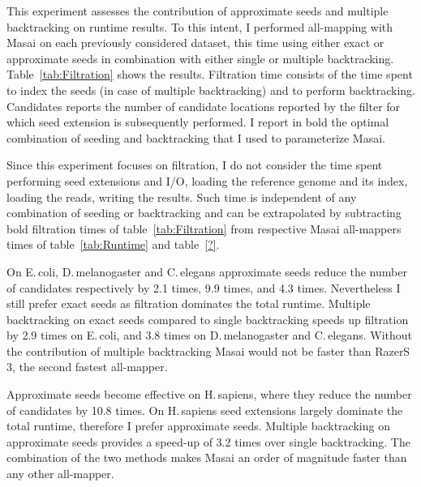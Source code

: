 This experiment assesses the contribution of approximate seeds and multiple backtracking on runtime results.
To this intent, I performed all-mapping with Masai on each previously considered dataset, this time using either exact or approximate seeds in combination with either single or multiple backtracking.
Table~\ref{tab:Filtration} shows the results.
Filtration time consists of the time spent to index the seeds (in case of multiple backtracking) and to perform backtracking.
Candidates reports the number of candidate locations reported by the filter for which seed extension is subsequently performed.
I report in bold the optimal combination of seeding and backtracking that I used to parameterize Masai.

Since this experiment focuses on filtration, I do not consider the time spent performing seed extensions and I/O, \ie loading the reference genome and its index, loading the reads, writing the results.
Such time is independent of any combination of seeding or backtracking and can be extrapolated by subtracting bold filtration times of table~\ref{tab:Filtration} from respective Masai all-mappers times of table~\ref{tab:Runtime} and table~\ref{?}.

On E.\,coli, D.\,melanogaster and C.\,elegans approximate seeds reduce the number of candidates respectively by 2.1 times, 9.9 times, and 4.3 times.
Nevertheless I still prefer exact seeds as filtration dominates the total runtime.
Multiple backtracking on exact seeds compared to single backtracking speeds up filtration by 2.9 times on E.\,coli, and 3.8 times on D.\,melanogaster and C.\,elegans.
Without the contribution of multiple backtracking Masai would not be faster than RazerS\,3, the second fastest all-mapper.

Approximate seeds become effective on H.\,sapiens, where they reduce the number of candidates by 10.8 times. 
On H.\,sapiens seed extensions largely dominate the total runtime, therefore I prefer approximate seeds.
Multiple backtracking on approximate seeds provides a speed-up of 3.2 times over single backtracking.
The combination of the two methods makes Masai an order of magnitude faster than any other all-mapper.

